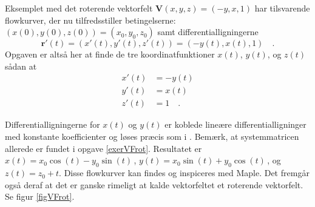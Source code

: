 \begin{example}\label{exVFrotFlow}
Eksemplet med det roterende vektorfelt $
{\mathbf{V}}(x,y,z) = (-y, x, 1)$ har tilsvarende
flow\-kurver, der nu tilfredsstiller
betingelserne: $(x(0), y(0), z(0)) = (x_{0},
y_{0}, z_{0})$ samt differential\-lig\-nin\-gerne
\begin{equation}
{\mathbf{r}}'(t) = (x'(t), y'(t), z'(t)) = (-y(t), x(t), 1) \quad.
\end{equation}
Opgaven er altså her at finde de tre koordinatfunktioner  $x(t)$, $y(t)$, og $z(t)$ sådan at
\begin{equation}
\begin{aligned}
x'(t) &= -y(t) \\
y'(t) &=  x(t) \\
z'(t) &=  1 \quad .
\end{aligned}
\end{equation}

Differentialligningerne for $x(t)$ og
$y(t)$ er koblede lineære differentialligninger
med konstante koefficienter og løses præcis som i
  . Bemærk, at systemmatricen
allerede er fundet i opgave \ref{exerVFrot}.
Resultatet er $x(t) = x_{0}\cos(t) -
y_{0}\sin(t)\,$, $y(t) =
x_{0}\sin(t)+y_{0}\cos(t)\,$, og $z(t) = z_{0} +
t$. Disse flowkurver kan findes og inspiceres med
Maple. Det fremgår også
deraf at det er ganske rimeligt at kalde
vektorfeltet et roterende vektorfelt. Se figur
\ref{figVFrot}.
\end{example}


